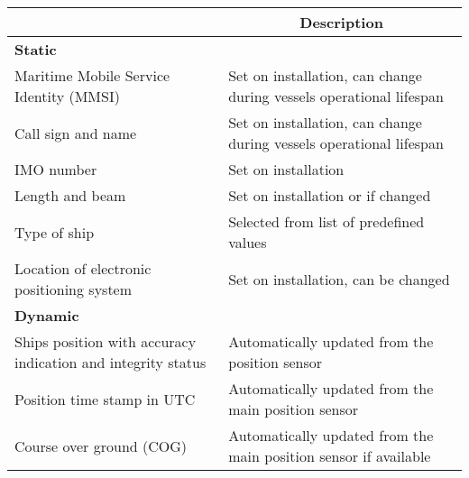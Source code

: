 \documentclass[../main.tex]{subfiles}
\begin{document}
\begin{table}[H]
\centering
\begin{tabular}{|m{5cm}|m{9cm}|}
\hline
\rowcolor[HTML]{C0C0C0} 
\multicolumn{1}{|c|}{\cellcolor[HTML]{C0C0C0}\textbf{Data}}  & \multicolumn{1}{c|}{\cellcolor[HTML]{C0C0C0}\textbf{Description}}                 \\ \hline
\rowcolor[HTML]{C0C0C0} 
\textbf{Static}                                              &                                                                                   \\ \hline
Maritime Mobile Service Identity (MMSI)                      & Set on installation, can change during vessels operational lifespan               \\ \hline
Call sign and name                                           & Set on installation, can change during vessels operational lifespan               \\ \hline
IMO number                                                   & Set on installation                                                               \\ \hline
Length and beam                                              & Set on installation or if changed                                                 \\ \hline
Type of ship                                                 & Selected from list of predefined values                                           \\ \hline
Location of electronic positioning system                    & Set on installation, can be changed                                               \\ \hline
\rowcolor[HTML]{C0C0C0} 
\textbf{Dynamic}                                             &                                                                                   \\ \hline
Ships position with accuracy indication and integrity status & Automatically updated from the position sensor                                    \\ \hline
Position time stamp in UTC                                   & Automatically updated from the main position sensor                               \\ \hline
Course over ground (COG)                                     & Automatically updated from the main position sensor if available                  \\ \hline

\end{tabular}
\end{table}
\end{document}
